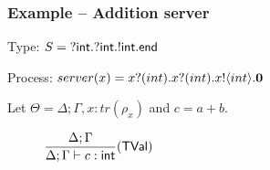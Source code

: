 \begin{frame}\frametitle{Example -- Addition server}

  Type: $ S = {}?\mathsf{int}. {}?\mathsf{int}. {}!\mathsf{int}. \mathsf{end} $


  Process: $ server(x) = {x}{}?(int). {x}{}?(int). x{}!\langle int\rangle. \mathbf{0} $

  Let $\Theta = \Delta; \Gamma, x: tr(\rho_x)$ and $c = a + b$.
  \begin{figure}[H]
    \noindent
  $

        \infrule{\Delta; \Gamma}
                {\Delta; \Gamma \types c: \tint}{\TVal}

  $

\end{figure}

\end{frame}
